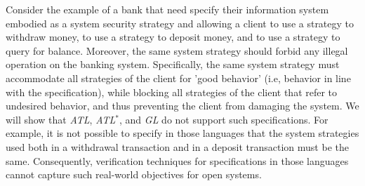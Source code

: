 Consider the example of a bank that need specify their information system embodied as a system security strategy and allowing a client to use a strategy to withdraw money, to use a strategy to deposit money, and to use a strategy to query for balance.
Moreover, the same system strategy should forbid any illegal operation on the banking system.  
Specifically, the same system strategy must accommodate all strategies of the client for 'good behavior' (i.e, behavior in line with the specification), while blocking all strategies of the client that refer to undesired behavior, and thus preventing the client from damaging the system.
We will show that {\em ATL}, {\em ATL}$^*$, and {\em GL} \cite{AHK02} do not support such specifications.  
For example, it is not possible to specify in those languages that the system strategies used both in a withdrawal transaction and in a deposit transaction must be the same.  
Consequently, verification techniques for specifications in those languages cannot capture such real-world objectives for open systems.  

